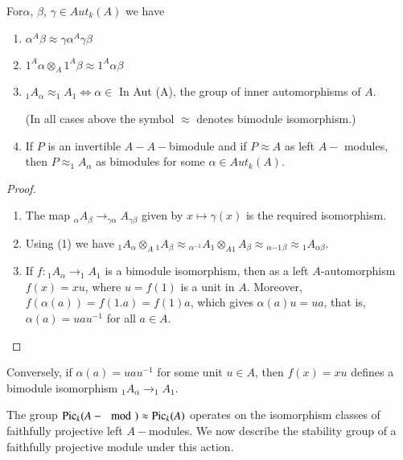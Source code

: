 \setcounter{lemma}{1}
\begin{lemma}\label{chap2:lem7.2}%
For\pageoriginale  $\alpha$, $\beta$, $\gamma \in Aut_k (A)$ we have 
\begin{enumerate}[(1)]
\item $\alpha^A \beta \approx \gamma \alpha^A \gamma \beta$

\item $1^A \alpha \otimes_A 1^A \beta \approx 1^A \alpha \beta$

\item $_1 A_\alpha \approx _1A_ 1 \Leftrightarrow \alpha \in$ In Aut
  (A), the group of inner automorphisms of $A$. 

(In all cases above the symbol $\approx$ denotes bimodule isomorphism.)

\item If $P$ is an invertible $A- A-$bimodule and if $P \approx A$ as
  left $A-$ modules, then $P \approx_1 A_\alpha$ as bimodules for some
  $\alpha \in Aut_k (A)$. 
\end{enumerate}
\end{lemma}

\begin{proof}
\begin{enumerate}[(1)]
\item The map $_\alpha A _\beta \rightarrow_{\gamma \alpha}A_{ \gamma
  \beta}$ given by $x \mapsto \gamma (x)$ is the required
  isomorphism. 

\item Using (1) we have ${_1} A{_\alpha} \otimes_{A}{ _1}A_{\beta}
  \approx { _{\alpha^{-1}}} A_1 \otimes_{A1} A_{\beta} \approx
          {_{\alpha{-1}}}{_ \beta} \approx {_1} A_{\alpha \beta}$. 

\item If $f: {_1} A_\alpha \rightarrow _1 A_1$ is a bimodule
  isomorphism, then as a left $A$-auto\-morphism $f(x) = xu$, where $u
  = f(1)$ is a unit in $A$. Moreover, $f(\alpha(a)) = f(1.a) =
  f(1)a$, which gives $\alpha(a) u = ua$, that is, $\alpha(a) =
  uau^{-1}$ for all $a \in A$. 
\end{enumerate}
\end{proof}

Conversely, if $\alpha (a) = uau^{-1}$ for some unit $u \in A$, then
$f(x) = xu$ defines a bimodule isomorphism $_1 A_\alpha \to _1 A_1$. 

The group $\operatorname{Pic}_k (A-\mod) \approx \operatorname{Pic}_k(A)$ operates on the
isomorphism classes of faithfully projective left $A-$modules. We now
describe the stability group of a faithfully projective module under
this action. 


